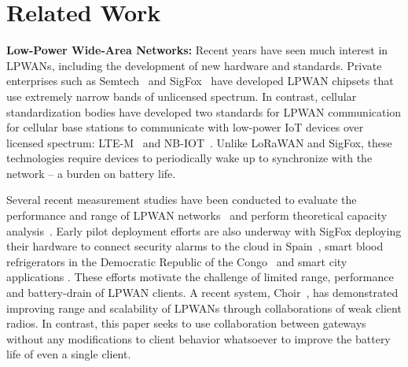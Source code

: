 \section{Related Work}
\label{sec:related-work}



\noindent \textbf{Low-Power Wide-Area Networks: } Recent years have seen much
interest in LPWANs, including the development
of new hardware and standards. Private enterprises such as
Semtech~\cite{LoRaWanAlliance2015} and SigFox~\cite{sanchez2016state} have
developed LPWAN chipsets that use extremely narrow bands of unlicensed
spectrum. In contrast, cellular standardization bodies have developed two
standards for LPWAN communication for cellular base stations to communicate
with low-power IoT devices over licensed spectrum:
LTE-M~\cite{GSMAssociation2016} and NB-IOT~\cite{ratasuk2016nb}. Unlike LoRaWAN
and SigFox, these technologies require devices to periodically wake up to
synchronize with the network -- a burden on battery life.

Several recent measurement studies have been conducted to evaluate the
performance and range of LPWAN networks~\cite{petric2016measurements,
toldov2016performance} and perform theoretical capacity
analysis~\cite{mikhaylov2016analysis}. Early pilot deployment efforts are also
underway with SigFox deploying their hardware to connect security alarms to
the cloud in Spain~\cite{sanchez2016state}, smart blood refrigerators in the
Democratic Republic of the Congo~\cite{ramachandranmupnp} and smart city
applications \cite{centenaro2015long}. These efforts motivate the challenge of
limited range, performance and battery-drain of LPWAN clients. A recent
system, Choir~\cite{eletreby2017empowering},  has demonstrated improving range
and scalability of LPWANs through collaborations of weak client radios. In
contrast, this paper seeks to use collaboration between gateways without any
modifications to client behavior whatsoever to improve the battery life of
even a single client.

